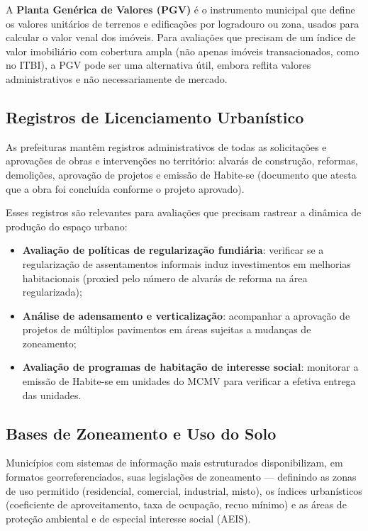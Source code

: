 A \textbf{Planta Genérica de Valores (PGV)} é o instrumento municipal que define os valores unitários de terrenos e edificações por logradouro ou zona, usados para calcular o valor venal dos imóveis. Para avaliações que precisam de um índice de valor imobiliário com cobertura ampla (não apenas imóveis transacionados, como no ITBI), a PGV pode ser uma alternativa útil, embora reflita valores administrativos e não necessariamente de mercado.

\subsection{Registros de Licenciamento Urbanístico}

As prefeituras mantêm registros administrativos de todas as solicitações e aprovações de obras e intervenções no território: alvarás de construção, reformas, demolições, aprovação de projetos e emissão de Habite-se (documento que atesta que a obra foi concluída conforme o projeto aprovado).

Esses registros são relevantes para avaliações que precisam rastrear a dinâmica de produção do espaço urbano:

\begin{itemize}
  \item \textbf{Avaliação de políticas de regularização fundiária}: verificar se a regularização de assentamentos informais induz investimentos em melhorias habitacionais (proxied pelo número de alvarás de reforma na área regularizada);
  \item \textbf{Análise de adensamento e verticalização}: acompanhar a aprovação de projetos de múltiplos pavimentos em áreas sujeitas a mudanças de zoneamento;
  \item \textbf{Avaliação de programas de habitação de interesse social}: monitorar a emissão de Habite-se em unidades do MCMV para verificar a efetiva entrega das unidades.
\end{itemize}

\subsection{Bases de Zoneamento e Uso do Solo}

Municípios com sistemas de informação mais estruturados disponibilizam, em formatos georreferenciados, suas legislações de zoneamento --- definindo as zonas de uso permitido (residencial, comercial, industrial, misto), os índices urbanísticos (coeficiente de aproveitamento, taxa de ocupação, recuo mínimo) e as áreas de proteção ambiental e de especial interesse social (AEIS).

